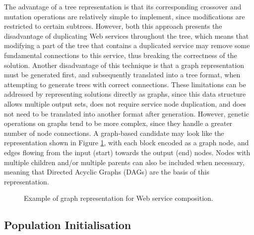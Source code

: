 The advantage of a tree representation is that its corresponding crossover and mutation operations are relatively simple to implement, since modifications are restricted to certain subtrees. However, both this approach presents the disadvantage of duplicating Web services throughout the tree, which means that modifying a part of the tree that contains a duplicated service may remove some fundamental connections to this service, thus breaking the correctness of the solution. Another disadvantage of this technique is that a graph representation must be generated first, and subsequently translated into a tree format, when attempting to generate trees with correct connections. These limitations can be addressed by representing solutions directly as graphs, since this data structure allows multiple output sets, does not require service node duplication, and does not need to be translated into another format after generation. However, genetic operations on graphs tend to be more complex, since they handle a greater number of node connections. A graph-based candidate may look like the representation shown in Figure \ref{fig:graph}, with each block encoded as a graph node, and edges flowing from the input (start) towards the output (end) nodes. Nodes with multiple children and/or multiple parents can also be included when necessary, meaning that Directed Acyclic Graphs (DAGs) are the basis of this representation.

\begin{figure}
\centerline{
}
\caption{Example of graph representation for Web service composition.}
\label{fig:graph}
\end{figure}

\subsection{Population Initialisation}

